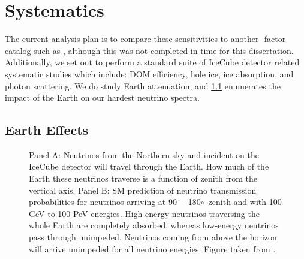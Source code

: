 \section{Systematics} \label{sec:icDM_Systematics}

The current analysis plan is to compare these sensitivities to another \J-factor catalog such as \LS \cite{DM_Strigari20}, although this was not completed in time for this dissertation.
Additionally, we set out to perform a standard suite of IceCube detector related systematic studies which include: DOM efficiency, hole ice, ice absorption, and photon scattering.
We do study Earth attenuation, and \cref{sec:icDM_eart_effects} enumerates the impact of the Earth on our hardest neutrino spectra.

\subsection{Earth Effects} \label{sec:icDM_eart_effects}

\begin{figure}[t]
    \caption{Panel A: Neutrinos from the Northern sky and incident on the IceCube detector will travel through the Earth. How much of the Earth these neutrinos traverse is a function of zenith from the vertical axis. Panel B: SM prediction of neutrino transmission probabilities for neutrinos arriving at 90$^\circ$ - 180$\circ$~zenith and with 100 GeV to 100 PeV energies. High-energy neutrinos traversing the whole Earth are completely absorbed, whereas low-energy neutrinos pass through unimpeded. Neutrinos coming from above the horizon will arrive unimpeded for all neutrino energies. Figure taken from \cite{IC3:Earth_Attenuation}.}
    \label{fig:earth_attenuation}
\end{figure}

